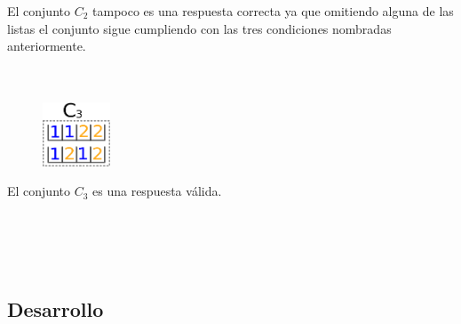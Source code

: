  El conjunto $C_{2}$ tampoco es una respuesta correcta ya que omitiendo alguna de las listas el conjunto sigue cumpliendo con las tres condiciones nombradas anteriormente. \\
 \\
 \\

\begin{figure}
  \vspace{-41pt}
  \begin{center}
    \includegraphics[width=2cm]{graficos/c3.png}
  \end{center}
\end{figure}



  El conjunto $C_{3}$ es una respuesta válida. 
\\ 
\\
\\
\\
\\



    \subsection{Desarrollo}


